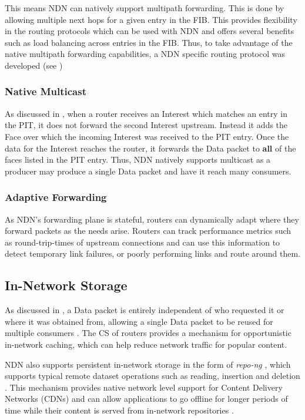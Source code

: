 This means NDN can natively support multipath forwarding. This is done by allowing multiple next hops for a given entry in the FIB. This provides flexibility in the routing protocols which can be used with NDN and offers several benefits such as load balancing across entries in the FIB. Thus, to take advantage of the native multipath forwarding capabilities, a NDN specific routing protocol was developed (see )

\subsubsection*{Native Multicast}
As discussed in , when a router receives an Interest which matches an entry in the PIT, it does not forward the second Interest upstream. Instead it adds the Face over which the incoming Interest was received to the PIT entry. Once the data for the Interest reaches the router, it forwards the Data packet to \textbf{all} of the faces listed in the PIT entry. Thus, NDN natively supports multicast as a producer may produce a single Data packet and have it reach many consumers. 

\subsubsection*{Adaptive Forwarding}
As NDN's forwarding plane is stateful, routers can dynamically adapt where they forward packets as the needs arise. Routers can track performance metrics such as round-trip-times of upstream connections and can use this information to detect temporary link failures, or poorly performing links and route around them.

\subsection{In-Network Storage}
As discussed in , a Data packet is entirely independent of who requested it or where it was obtained from, allowing a single Data packet to be reused for multiple consumers \cite{ndn}. The CS of routers provides a mechanism for opportunistic in-network caching, which can help reduce network traffic for popular content. 

NDN also supports persistent in-network storage in the form of \textit{repo-ng} \cite{ndn-repo}, which supports typical remote dataset operations such as reading, insertion and deletion \cite{ndn-repo-homepage}. This mechanism provides native network level support for Content Delivery Networks (CDNs) and can allow applications to go offline for longer periods of 
time while their content is served from in-network repositories \cite{ndn}.



